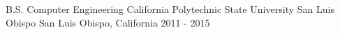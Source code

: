 


\begin{cventriesedu}


\cventryedu
{B.S. Computer Engineering} %
{California Polytechnic State University San Luis Obispo} %
{San Luis Obispo, California} %
{2011 - 2015} %
{ %
}


\end{cventriesedu}
